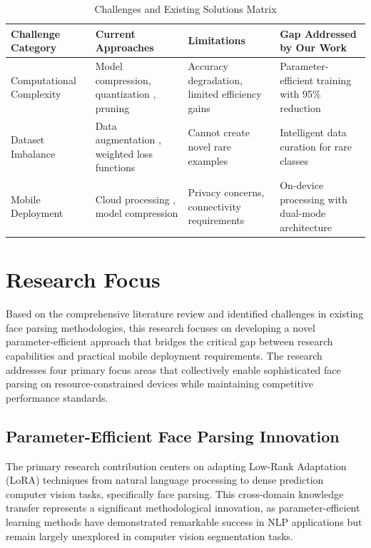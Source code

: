 \documentclass[12pt,a4paper]{report}
\begin{document}
\begin{table}[H]
\centering
\caption{Challenges and Existing Solutions Matrix}
\label{tab:challenges_solutions_matrix}
\begin{tabular}{|p{3cm}|p{3.5cm}|p{3.5cm}|p{3.5cm}|}
\hline
\textbf{Challenge Category} & \textbf{Current Approaches} & \textbf{Limitations} & \textbf{Gap Addressed by Our Work} \\
\hline
Computational Complexity & Model compression, quantization \cite{jacob2018quantization}, pruning \cite{louizos2018learning} & Accuracy degradation, limited efficiency gains & Parameter-efficient training with 95\% reduction \\
\hline
Dataset Imbalance & Data augmentation \cite{shorten2019survey}, weighted loss functions \cite{lin2017focal} & Cannot create novel rare examples & Intelligent data curation for rare classes \\
\hline
Mobile Deployment & Cloud processing \cite{chen2022mobile}, model compression \cite{howard2017mobilenets} & Privacy concerns, connectivity requirements & On-device processing with dual-mode architecture \\
\hline
\end{tabular}
\end{table}

\section{Research Focus}

Based on the comprehensive literature review and identified challenges in existing face parsing methodologies, this research focuses on developing a novel parameter-efficient approach that bridges the critical gap between research capabilities and practical mobile deployment requirements. The research addresses four primary focus areas that collectively enable sophisticated face parsing on resource-constrained devices while maintaining competitive performance standards.

\subsection{Parameter-Efficient Face Parsing Innovation}

The primary research contribution centers on adapting Low-Rank Adaptation (LoRA) techniques from natural language processing to dense prediction computer vision tasks, specifically face parsing. This cross-domain knowledge transfer represents a significant methodological innovation, as parameter-efficient learning methods have demonstrated remarkable success in NLP applications but remain largely unexplored in computer vision segmentation tasks.
\end{document}

